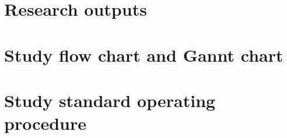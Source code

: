 \documentclass[a4paper,10pt]{article}
\begin{document}
\begin{appendices}

\section{Research outputs}


\section{Study flow chart and Gannt chart}




\section{Study standard operating procedure}

\newpage

\end{appendices}
     
\makeatletter
 \def\@biblabel#1{#1}
\makeatother



\end{document}
